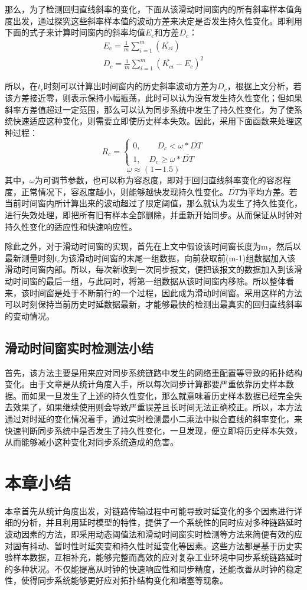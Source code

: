 那么，为了检测回归直线斜率的变化，下面从该滑动时间窗内的所有斜率样本值角度出发，通过探究这些斜率样本值的波动方差来决定是否发生持久性变化。即利用下面的式子来计算时间窗内的斜率均值$E_{c}$和方差$D_{c}$：
\begin{align}
E_{c} = \frac{1}{m}\sum_{i=1}^{m}(\overline{K_{ci}}) \\
D_{c} = \frac{1}{m}\sum_{i=1}^{m}(\overline{K_{ci}} - E_{c}) ^ {2}
\end{align}

所以，在$t_{c}$时刻可以计算出时间窗内的历史斜率波动方差为$D_{c}$，根据上文分析，若该方差接近零，则表示保持小幅振荡，此时可以认为没有发生持久性变化；但如果斜率方差值超过一定范围，那么可以认为同步系统中发生了持久性变化，为了使系统快速适应这种变化，则需要立即使历史样本失效。因此，采用下面函数来处理这种过程：
\begin{equation}
R_{c} = \left\{
	\begin{array}{ll} %
		0, \qquad D_{c} < \omega * \overline{DT} \\
		1, \quad D_{c} \geq \omega * \overline{DT} 
	\end{array}
	\right. 
\end{equation}
\begin{equation}
	\omega \approx (1 － 1.5)
\end{equation}
其中，$\omega$为可调节参数，也可以称为容忍度，即对于回归直线斜率变化的容忍程度，正常情况下，容忍度越小，则能够越快发现持久性变化。$\overline{DT}$为平均方差。若当前时间窗内所计算出来的波动超过了限定阈值，那么就认为发生了持久性变化，进行失效处理，即把所有旧有样本全部删除，并重新开始同步。从而保证从时钟对持久性变化的适应性和快速响应性。

除此之外，对于滑动时间窗的实现，首先在上文中假设该时间窗长度为m，然后以最新测量时刻$t_{c}$为该滑动时间窗的末尾一组数据，向前获取前(m-1)组数据加入该滑动时间窗内部。所以，每次新收到一次同步报文，便把该报文的数据加入到该滑动时间窗的最后一组，与此同时，将第一组数据从该时间窗内移除。所以整体看来，该时间窗是处于不断前行的一个过程，因此成为滑动时间窗。采用这样的方法可以时刻保持当前历史时延数据最新，才能够最快的检测出最真实的回归直线斜率的变动情况。

\subsection{滑动时间窗实时检测法小结}
首先，该方法主要是用来应对同步系统链路中发生的网络重配置等导致的拓扑结构变化。由于文章是从统计角度入手，所以每次同步计算都要严重依靠历史样本数据。而如果一旦发生了上述的持久性变化，那么就意味着历史样本数据已经完全失去效果了，如果继续使用则会导致严重误差且长时间无法正确校正。所以，本方法通过对时延的变化情况着手，通过实时检测最小二乘法中拟合直线的斜率变化，来快速判断同步系统中是否发生了持久性变化，一旦发现，便立即将历史样本失效，从而能够减小这种变化对同步系统造成的危害。

\section{本章小结}
本章首先从统计角度出发，对链路传输过程中可能导致时延变化的多个因素进行详细的分析，并且利用延时模型的特性，提供了一个系统性的同时应对多种链路延时波动因素的方法，即采用动态阈值法和滑动时间窗实时检测等方法来简便有效的应对固有抖动、暂时性时延突变和持久性时延变化等因素。这些方法都是基于历史实验样本数据，互相补充，能够完整而高效的应对复杂工业环境中同步系统链路延时的多种状况。不仅能提高从时钟的快速响应性和同步精度，还能改善从时钟的稳定性，使得同步系统能够更好应对拓扑结构变化和堵塞等现象。
